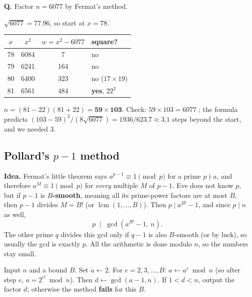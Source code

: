 \begin{worked}
\textbf{Q.} Factor $n = 6077$ by Fermat's method.

$\sqrt{6077} = 77.96$, so start at $x = 78$.
\begin{center}\small
\begin{tabular}{@{}cccl@{}}
\toprule
$x$ & $x^2$ & $w = x^2 - 6077$ & square?\\
\midrule
78 & 6084 & 7 & no\\
79 & 6241 & 164 & no\\
80 & 6400 & 323 & no ($17 \times 19$)\\
81 & 6561 & 484 & \textbf{yes}, $22^2$\\
\bottomrule
\end{tabular}
\end{center}
$n = (81 - 22)(81 + 22) = \mathbf{59 \times 103}$. Check: $59 \times 103 = 6077$ \checkmark; the formula predicts $(103 - 59)^2/(8\sqrt{6077}) = 1936/623.7 \approx 3.1$ steps beyond the start, and we needed 3.
\end{worked}

\subsection{Pollard's $p - 1$ method \hot\new}

\textbf{Idea.} Fermat's little theorem says $a^{p-1} \equiv 1 \pmod p$ for a prime $p \nmid a$, and therefore $a^{M} \equiv 1 \pmod p$ for \emph{every} multiple $M$ of $p - 1$. Eve does not know $p$, but if $p - 1$ is \textbf{$B$-smooth}, meaning all its prime-power factors are at most $B$, then $p - 1$ divides $M = B!$ (or $\operatorname{lcm}(1, \dots, B)$). Then $p \mid a^{B!} - 1$, and since $p \mid n$ as well,
\[
p \;\mid\; \gcd(a^{B!} - 1,\ n).
\]
The other prime $q$ divides this gcd only if $q - 1$ is also $B$-smooth (or by luck), so usually the gcd is exactly $p$. All the arithmetic is done modulo $n$, so the numbers stay small.

\begin{keybox}[title={Pollard $p - 1$ (Forouzan's form)}]
Input $n$ and a bound $B$. Set $a \leftarrow 2$. For $e = 2, 3, \dots, B$: $a \leftarrow a^{e} \bmod n$ (so after step $e$, $a = 2^{e!} \bmod n$). Then $d \leftarrow \gcd(a - 1, n)$.
If $1 < d < n$, output the factor $d$; otherwise the method \textbf{fails} for this $B$.
\end{keybox}

